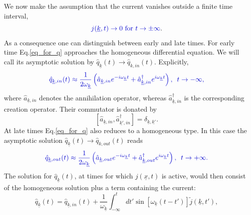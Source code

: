\documentclass[12pt, titlepage]{article}
\begin{document}
We now make the assumption that the current vanishes outside a finite time interval,
\begin{equation}
\textcolor[RGB]{0,0,204}{
j(\underline{k},t)\rightarrow 0 \text{ for } t\rightarrow \pm \infty
}.
\end{equation}
As a consequence one can distinguish between early and late times. For early time  Eq.\enskip\eqref{eq_for_q} approaches the homogeneous differential equation. We will call its asymptotic solution by $ \hat{q}_{\underline{k}}(t) \rightarrow \hat{q}_{k,in}(t) $. Explicitly, 
\begin{equation}\label{q_In_operators}
 \textcolor[RGB]{0,0,204}{
 \hat{q}_{\underline{k},in}(t) 
  \approx
  \dfrac{1}{2\omega_{\underline{k}}}\left(
	\hat{a}_{\underline{k},in} 
	e^{-i\omega_{\underline{k}}t}
	+
	\hat{a}^{\dagger}_{\underline{k},in}  
	e^{i\omega_{\underline{k}}t}
  \right) 
  ,
   \enskip t\rightarrow -\infty,}
\end{equation}
where $ \hat{a}_{\underline{k},in} $ denotes the annihilation operator, whereas $ \hat{a}^{\dagger}_{\underline{k},in} $ is the corresponding creation operator. Their commutator is donated by 
\begin{equation}\label{crea_anni_commutator}
\left[ 
\hat{a}_{\underline{k},in}
,
\hat{a}^{\dagger}_{\underline{k'},in}
\right] 
=\delta_{\underline{k},\underline{k'}}
.
\end{equation}
At late times Eq.\enskip\eqref{eq_for_q} also reduces to a homogeneous type. In this case the asymptotic solution $ \hat{q}_{\underline{k}}(t) \rightarrow \hat{q}_{k,out}(t) $ reads
\begin{equation}\label{q_Out_operators}
 \textcolor[RGB]{0,0,204}{
 \hat{q}_{\underline{k},out}(t) 
  \approx
  \dfrac{1}{2\omega_{\underline{k}}}\left(
	\hat{a}_{\underline{k},out} 
	e^{-i\omega_{\underline{k}}t}
	+
	\hat{a}^{\dagger}_{\underline{k},out}  
	e^{i\omega_{\underline{k}}t}
  \right) 
  ,
  \enskip t\rightarrow +\infty.}
\end{equation}
The solution for $ \hat{q}_{\underline{k}}(t) $, at times for which $ j(\underline{x},t) $ is active, would then consist of the homogeneous solution plus a term containing the current:
\begin{equation}\label{q_full}
 \hat{q}_{\underline{k}}(t) 
  =
  \hat{q}_{\underline{k},in}(t) 
  +
    \dfrac{1}{\omega_{\underline{k}}}
    \int^{t}_{-\infty}
    dt'
    \sin\left[\omega_{\underline{k}}(t-t') \right] \tilde{j}(\underline{k},t')
    ,
\end{equation}
\end{document}

